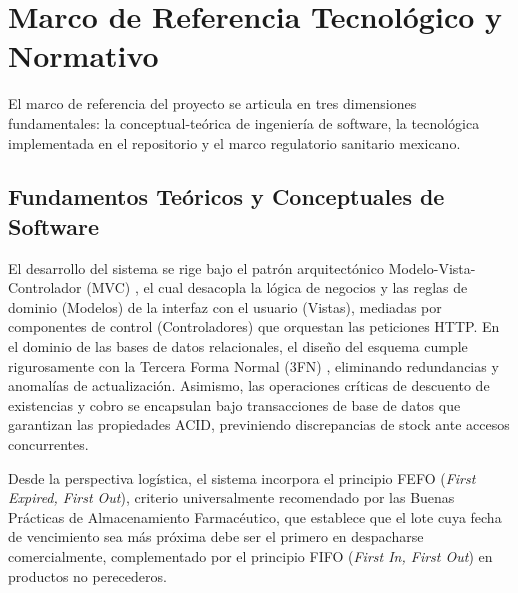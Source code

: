 \section{Marco de Referencia Tecnológico y Normativo}

El marco de referencia del proyecto se articula en tres dimensiones fundamentales: la conceptual-teórica de ingeniería de software, la tecnológica implementada en el repositorio y el marco regulatorio sanitario mexicano.

\subsection{Fundamentos Teóricos y Conceptuales de Software}
El desarrollo del sistema se rige bajo el patrón arquitectónico Modelo-Vista-Controlador (MVC) \cite{pressman2014, sommerville2011}, el cual desacopla la lógica de negocios y las reglas de dominio (Modelos) de la interfaz con el usuario (Vistas), mediadas por componentes de control (Controladores) que orquestan las peticiones HTTP. En el dominio de las bases de datos relacionales, el diseño del esquema cumple rigurosamente con la Tercera Forma Normal (3FN) \cite{elmasri2016}, eliminando redundancias y anomalías de actualización. Asimismo, las operaciones críticas de descuento de existencias y cobro se encapsulan bajo transacciones de base de datos que garantizan las propiedades ACID, previniendo discrepancias de stock ante accesos concurrentes.

Desde la perspectiva logística, el sistema incorpora el principio FEFO (\textit{First Expired, First Out}), criterio universalmente recomendado por las Buenas Prácticas de Almacenamiento Farmacéutico, que establece que el lote cuya fecha de vencimiento sea más próxima debe ser el primero en despacharse comercialmente, complementado por el principio FIFO (\textit{First In, First Out}) en productos no perecederos.

